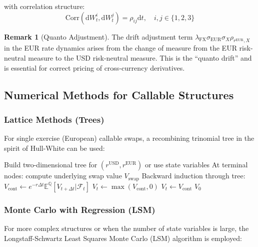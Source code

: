 \documentclass[11pt,a4paper]{article}
\theoremstyle{definition}
\newtheorem{remark}{Remark}[section]
\newcommand{\E}{\mathbb{E}}
\newcommand{\Q}{\mathbb{Q}}
\newcommand{\diff}{\mathrm{d}}
\begin{document}
with correlation structure:
\begin{equation}
\text{Corr}(\diff W^i_t, \diff W^j_t) = \rho_{ij} \diff t, \quad i,j \in \{1,2,3\}
\end{equation}

\begin{remark}[Quanto Adjustment]
The drift adjustment term $\lambda_{\text{FX}} \sigma_{\text{EUR}} \sigma_X \rho_{r^{\text{EUR}},X}$ in the EUR rate dynamics arises from the change of measure from the EUR risk-neutral measure to the USD risk-neutral measure. This is the ``quanto drift'' and is essential for correct pricing of cross-currency derivatives.
\end{remark}

\subsection{Numerical Methods for Callable Structures}

\subsubsection{Lattice Methods (Trees)}

For single exercise (European) callable swaps, a recombining trinomial tree in the spirit of Hull-White can be used:

\begin{algorithm}
\caption{Trinomial Tree for Callable CCIRS}
\begin{algorithmic}[1]
\State Build two-dimensional tree for $(r^{\text{USD}}, r^{\text{EUR}})$ or use state variables
\State At terminal nodes: compute underlying swap value $V_{\text{swap}}$
\State Backward induction through tree:
        \State $V_{\text{cont}} \gets e^{-r \Delta t} \E^{\Q}[V_{t+\Delta t} | \mathcal{F}_t]$
            \State $V_t \gets \max(V_{\text{cont}}, 0)$ 
        \Else
            \State $V_t \gets V_{\text{cont}}$
        \EndIf
    \EndFor
\EndFor
\State \Return $V_0$
\end{algorithmic}
\end{algorithm}

\subsubsection{Monte Carlo with Regression (LSM)}

For more complex structures or when the number of state variables is large, the Longstaff-Schwartz Least Squares Monte Carlo (LSM) algorithm is employed:
\end{document}
